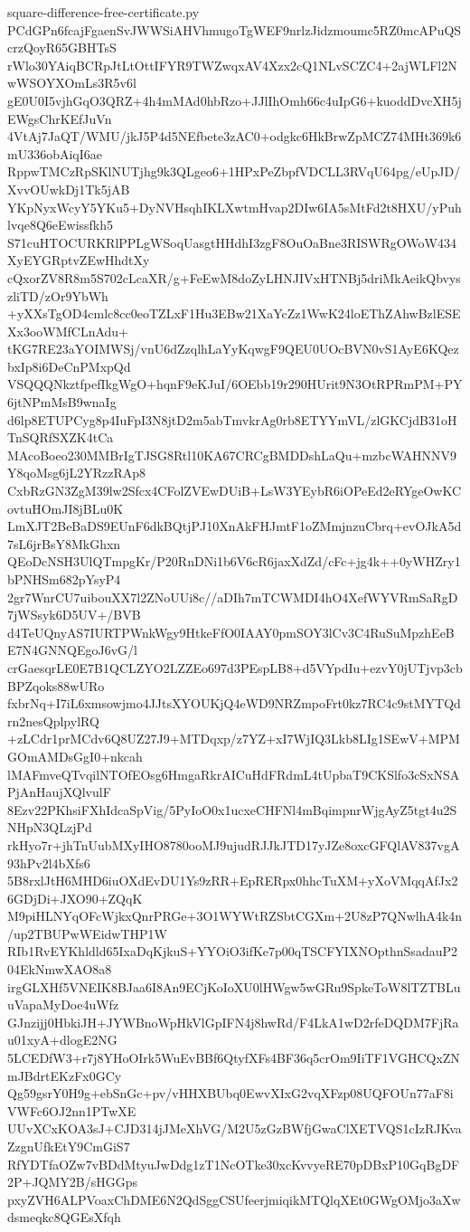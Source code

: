 \documentclass[11pt]{article}
\theoremstyle{definition}
\theoremstyle{remark}
\begin{document}
\begin{filecontents*}[overwrite]{square-difference-free-certificate.py}
PCdGPn6fcajFgaenSvJWWSiAHVhmugoTgWEF9nrlzJidzmoumc5RZ0mcAPuQScrzQoyR65GBHTsS
rWlo30YAiqBCRpJtLtOttIFYR9TWZwqxAV4Xzx2cQ1NLvSCZC4+2ajWLFl2NwWSOYXOmLs3R5v6l
gE0U0I5vjhGqO3QRZ+4h4mMAd0hbRzo+JJlIhOmh66c4uIpG6+kuoddDvcXH5jEWgsChrKEfJuVn
4VtAj7JaQT/WMU/jkJ5P4d5NEfbete3zAC0+odgkc6HkBrwZpMCZ74MHt369k6mU336obAiqI6ae
RppwTMCzRpSKlNUTjhg9k3QLgeo6+1HPxPeZbpfVDCLL3RVqU64pg/eUpJD/XvvOUwkDj1Tk5jAB
YKpNyxWcyY5YKu5+DyNVHsqhIKLXwtmHvap2DIw6IA5sMtFd2t8HXU/yPuhlvqe8Q6eEwissfkh5
S71cuHTOCURKRlPPLgWSoqUasgtHHdhI3zgF8OuOaBne3RISWRgOWoW434XyEYGRptvZEwHhdtXy
cQxorZV8R8m5S702cLcaXR/g+FeEwM8doZyLHNJIVxHTNBj5driMkAeikQbvyszliTD/zOr9YbWh
+yXXsTgOD4cmlc8cc0eoTZLxF1Hu3EBw21XaYcZz1WwK24loEThZAhwBzlESEXx3ooWMfCLnAdu+
tKG7RE23aYOIMWSj/vnU6dZzqlhLaYyKqwgF9QEU0UOcBVN0vS1AyE6KQezbxIp8i6DeCnPMxpQd
VSQQQNkztfpefIkgWgO+hqnF9eKJuI/6OEbb19r290HUrit9N3OtRPRmPM+PY6jtNPmMsB9wnaIg
d6lp8ETUPCyg8p4IuFpI3N8jtD2m5abTmvkrAg0rb8ETYYmVL/zlGKCjdB31oHTnSQRfSXZK4tCa
MAcoBoeo230MMBrIgTJSG8Rtl10KA67CRCgBMDDshLaQu+mzbcWAHNNV9Y8qoMsg6jL2YRzzRAp8
CxbRzGN3ZgM39lw2Sfcx4CFolZVEwDUiB+LsW3YEybR6iOPeEd2eRYgeOwKCovtuHOmJI8jBLu0K
LmXJT2BeBaDS9EUnF6dkBQtjPJ10XnAkFHJmtF1oZMmjnzuCbrq+evOJkA5d7sL6jrBsY8MkGhxn
QEoDcNSH3UlQTmpgKr/P20RnDNi1b6V6cR6jaxXdZd/cFc+jg4k++0yWHZry1bPNHSm682pYsyP4
2gr7WnrCU7uibouXX7l2ZNoUUi8c//aDIh7mTCWMDI4hO4XefWYVRmSaRgD7jWSsyk6D5UV+/BVB
d4TeUQnyAS7IURTPWnkWgy9HtkeFfO0IAAY0pmSOY3lCv3C4RuSuMpzhEeBE7N4GNNQEgoJ6vG/l
crGaesqrLE0E7B1QCLZYO2LZZEo697d3PEspLB8+d5VYpdIu+ezvY0jUTjvp3cbBPZqoks88wURo
fxbrNq+I7iL6xmsowjmo4JJtsXYOUKjQ4eWD9NRZmpoFrt0kz7RC4c9stMYTQdrn2nesQplpylRQ
+zLCdr1prMCdv6Q8UZ27J9+MTDqxp/z7YZ+xI7WjIQ3Lkb8LIg1SEwV+MPMGOmAMDsGgI0+nkcah
lMAFmveQTvqilNTOfEOsg6HmgaRkrAICuHdFRdmL4tUpbaT9CKSlfo3cSxNSAPjAnHaujXQlvulF
8Ezv22PKhsiFXhIdcaSpVig/5PyIoO0x1ucxeCHFNl4mBqimpnrWjgAyZ5tgt4u2SNHpN3QLzjPd
rkHyo7r+jhTnUubMXyIHO8780ooMJ9ujudRJJkJTD17yJZe8oxcGFQlAV837vgA93hPv2l4bXfs6
5B8rxlJtH6MHD6iuOXdEvDU1Ys9zRR+EpRERpx0hhcTuXM+yXoVMqqAfJx26GDjDi+JXO90+ZQqK
M9piHLNYqOFcWjkxQnrPRGe+3O1WYWtRZSbtCGXm+2U8zP7QNwlhA4k4n/up2TBUPwWEidwTHP1W
RIb1RvEYKhldld65IxaDqKjkuS+YYOiO3ifKe7p00qTSCFYIXNOpthnSsadauP204EkNmwXAO8a8
irgGLXHf5VNEIK8BJaa6I8An9ECjKoIoXU0lHWgw5wGRu9SpkeToW8lTZTBLuuVapaMyDoe4uWfz
GJnzijj0HbkiJH+JYWBnoWpHkVlGpIFN4j8hwRd/F4LkA1wD2rfeDQDM7FjRau01xyA+dlogE2NG
5LCEDfW3+r7j8YHoOIrk5WuEvBBf6QtyfXFs4BF36q5crOm9IiTF1VGHCQxZNmJBdrtEKzFx0GCy
Qg59gsrY0H9g+ebSnGc+pv/vHHXBUbq0EwvXIxG2vqXFzp08UQFOUn77aF8iVWFc6OJ2nn1PTwXE
UUvXCxKOA3sJ+CJD314jJMeXhVG/M2U5zGzBWfjGwaClXETVQS1cIzRJKvaZzgnUfkEtY9CmGiS7
RfYDTfaOZw7vBDdMtyuJwDdg1zT1NcOTke30xcKvvyeRE70pDBxP10GqBgDF2P+JQMY2B/sHGGps
pxyZVH6ALPVoaxChDME6N2QdSggCSUfeerjmiqikMTQlqXEt0GWgOMjo3aXwdsmeqkc8QGEsXfqh

\end{filecontents*}
\end{document}
